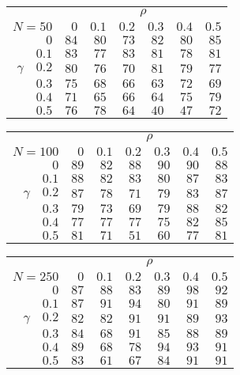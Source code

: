 \begin{tabular}{r|rrrrrr}
\hline\hline
 &\multicolumn{6}{c}{$\rho$} \\ 
 $N = 50$ & $0$ & $0.1$ & $0.2$ & $0.3$ & $0.4$ & $0.5$ \\ 
 \hline$0$ & $84$ & $80$ & $73$ & $82$ & $80$ & $85$\\ 
$0.1$ & $83$ & $77$ & $83$ & $81$ & $78$ & $81$\\ 
$\gamma\quad$$0.2$ & $80$ & $76$ & $70$ & $81$ & $79$ & $77$\\ 
$0.3$ & $75$ & $68$ & $66$ & $63$ & $72$ & $69$\\ 
$0.4$ & $71$ & $65$ & $66$ & $64$ & $75$ & $79$\\ 
$0.5$ & $76$ & $78$ & $64$ & $40$ & $47$ & $72$\\ 
 \hline 
 \end{tabular}
 
 \vspace{2em} 
 
\begin{tabular}{r|rrrrrr}
\hline\hline
 &\multicolumn{6}{c}{$\rho$} \\ 
 $N = 100$ & $0$ & $0.1$ & $0.2$ & $0.3$ & $0.4$ & $0.5$ \\ 
 \hline$0$ & $89$ & $82$ & $88$ & $90$ & $90$ & $88$\\ 
$0.1$ & $88$ & $82$ & $83$ & $80$ & $87$ & $83$\\ 
$\gamma\quad$$0.2$ & $87$ & $78$ & $71$ & $79$ & $83$ & $87$\\ 
$0.3$ & $79$ & $73$ & $69$ & $79$ & $88$ & $82$\\ 
$0.4$ & $77$ & $77$ & $77$ & $75$ & $82$ & $85$\\ 
$0.5$ & $81$ & $71$ & $51$ & $60$ & $77$ & $81$\\ 
 \hline 
 \end{tabular}
 
 \vspace{2em} 
 
\begin{tabular}{r|rrrrrr}
\hline\hline
 &\multicolumn{6}{c}{$\rho$} \\ 
 $N = 250$ & $0$ & $0.1$ & $0.2$ & $0.3$ & $0.4$ & $0.5$ \\ 
 \hline$0$ & $87$ & $88$ & $83$ & $89$ & $98$ & $92$\\ 
$0.1$ & $87$ & $91$ & $94$ & $80$ & $91$ & $89$\\ 
$\gamma\quad$$0.2$ & $82$ & $82$ & $91$ & $91$ & $89$ & $93$\\ 
$0.3$ & $84$ & $68$ & $91$ & $85$ & $88$ & $89$\\ 
$0.4$ & $89$ & $68$ & $78$ & $94$ & $93$ & $91$\\ 
$0.5$ & $83$ & $61$ & $67$ & $84$ & $91$ & $91$\\ 
 \hline 
 \end{tabular}